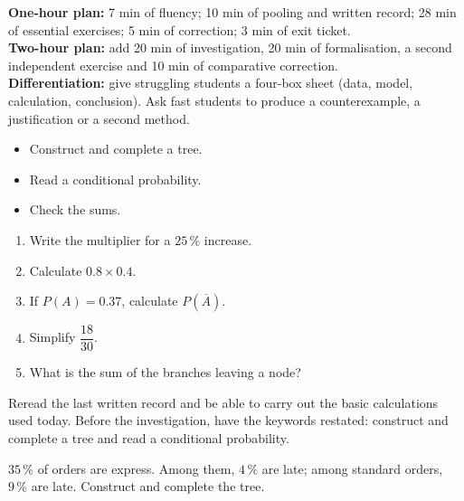 \ifprof
\begin{methode}
\textbf{One-hour plan:} 7 min of fluency; 10 min of pooling and written record; 28 min of essential exercises; 5 min of correction; 3 min of exit ticket.\\
\textbf{Two-hour plan:} add 20 min of investigation, 20 min of formalisation, a second independent exercise and 10 min of comparative correction.\\
\textbf{Differentiation:} give struggling students a four-box sheet (data, model, calculation, conclusion). Ask fast students to produce a counterexample, a justification or a second method.
\end{methode}
\fi
{}
    \begin{objectifs}\begin{itemize}\item Construct and complete a tree.\item Read a conditional probability.\item Check the sums.\end{itemize}\end{objectifs}
    \begin{automatismes}\begin{enumerate}\item Write the multiplier for a $25\,\%$ increase. \item Calculate $0.8\times0.4$. \item If $P(A)=0.37$, calculate $P(\overline A)$. \item Simplify $\dfrac{18}{30}$. \item What is the sum of the branches leaving a node? \end{enumerate}\end{automatismes}
    \begin{prerequis}Reread the last written record and be able to carry out the basic calculations used today. Before the investigation, have the keywords restated: construct and complete a tree and read a conditional probability.\end{prerequis}

    \begin{activite}
    $35\,\%$ of orders are express. Among them, $4\,\%$ are late; among standard orders, $9\,\%$ are late. Construct and complete the tree.
    \begin{center}\end{center}
    \end{activite}

